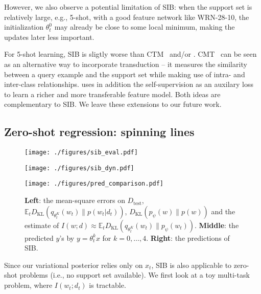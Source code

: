 \documentclass{article} \usepackage{iclr2020_conference,times}
\newcommand{\E}{\mathbb{E}}
\begin{document}
However, we also observe a potential limitation of SIB:
when the support set is relatively large, e.g., 5-shot,
with a good feature network like WRN-28-10,
the initialization $\theta_t^0$ may already be close to some local minimum,
making the updates later less important.

For 5-shot learning, SIB is sligtly worse than CTM~\citep{li2019ctm} and/or \citet{gidaris2019boosting}.
CMT~\citep{li2019ctm} can be seen as an alternative way to incorporate transduction -- 
it measures the similarity between a query example and the support set while making use of intra- and inter-class relationships.  
\citet{gidaris2019boosting} uses in addition the self-supervision as an auxilary loss to learn a richer and more transferable feature model.
Both ideas are complementary to SIB. We leave these extensions to our future work.


\subsection{Zero-shot regression: spinning lines} 


\begin{figure*}[ht]
	\centering
	\begin{minipage}{.32\textwidth}
		\centering
		\texttt{[image: ./figures/sib\_eval.pdf]}
	\end{minipage} 
	\hfill
	\begin{minipage}{.32\textwidth}
		\centering
		\texttt{[image: ./figures/sib\_dyn.pdf]}
	\end{minipage}
	\hfill
	\begin{minipage}{.32\textwidth}
		\centering
		\texttt{[image: ./figures/pred\_comparison.pdf]}
	\end{minipage}
	\caption{\textbf{Left}: the mean-square errors on $D_\text{test}$,
        $\E_t D_\text{KL}(q_{\theta_t^K}(w_t) \| p(w_t|d_t))$, $D_\text{KL}(p_\psi(w) \| p(w))$ and the estimate
        of $I(w; d) \approx \E_t D_\text{KL}(q_{\theta_t^K}(w_t) \| p_\psi(w_t))$.
		\textbf{Middle}: the predicted $y$'s by $y = \theta_t^k x$ for $k = 0,\ldots,4$. \textbf{Right}: the predictions of SIB.}
	\label{fig:toy}
\end{figure*}


Since our variational posterior relies only on $x_t$, SIB is also applicable to zero-shot problems (i.e., no support set available).
We first look at a toy multi-task problem, where $I(w_t; d_t)$ is tractable.
\end{document}
